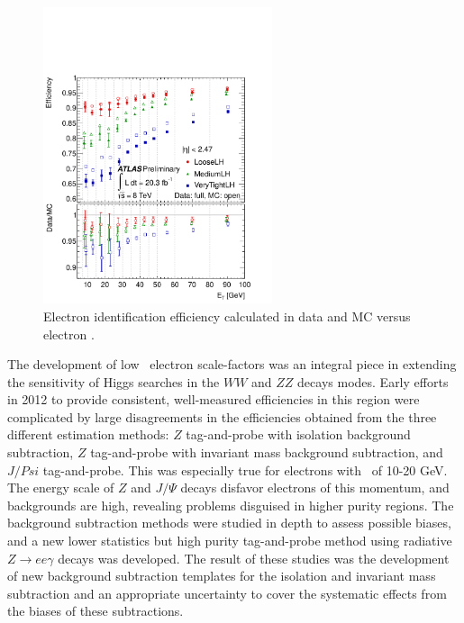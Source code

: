 \begin{figure}[!t]
\centering 
\includegraphics[width=0.60\textwidth]{figs/systematics/fig_22a}
\caption{Electron identification efficiency calculated in data and MC versus electron \pt.} 
\label{figure:electron_eff}
\end{figure}

The development of low \pt\ electron scale-factors was an integral piece in extending the sensitivity of Higgs searches in the $WW$ and $ZZ$ decays modes. Early efforts in 2012 to provide consistent, well-measured efficiencies in this region were complicated by large disagreements in the efficiencies obtained from the three different estimation methods: $Z$ tag-and-probe with isolation background subtraction, $Z$ tag-and-probe with invariant mass background subtraction, and $J/Psi$ tag-and-probe. This was especially true for electrons with \pt\ of 10-20 GeV. The energy scale of $Z$ and $J/\Psi$ decays disfavor electrons of this momentum, and backgrounds are high, revealing problems disguised in higher purity regions. The background subtraction methods were studied in depth to assess possible biases, and a new lower statistics but high purity tag-and-probe method using radiative $Z\rightarrow ee\gamma$ decays was developed. The result of these studies was the development of new background subtraction templates for the isolation and invariant mass subtraction and an appropriate uncertainty to cover the systematic effects from the biases of these subtractions.



